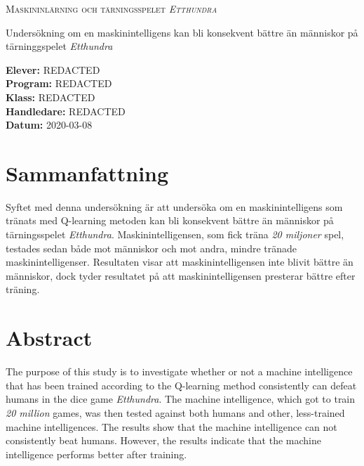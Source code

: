 \documentclass[12pt,a4paper]{article}
\begin{document}
  \begin{titlepage}
    \begin{center}
      \begin{huge}\textsc{Maskininlärning och tärningsspelet \emph{Etthundra}} \\
        \vspace{0.75cm}
      \end{huge}
      \large{Undersökning om en maskinintelligens kan bli konsekvent bättre än människor på tärninggspelet \emph{Etthundra}}
    \end{center}


    \vspace{\fill}
    \begin{flushleft}
      \textbf{Elever:} REDACTED \\
      \textbf{Program:} REDACTED \\
      \textbf{Klass:} REDACTED \\
      \textbf{Handledare:} REDACTED \\
      \textbf{Datum:} 2020-03-08
    \end{flushleft}
  \end{titlepage}
  

  \section*{Sammanfattning}\label{sec:samanfattning}
    Syftet med denna undersökning är att undersöka om en maskinintelligens som tränats med Q-learning metoden kan bli konsekvent bättre än människor på tärningsspelet \emph{Etthundra}. Maskinintelligensen, som fick träna \emph{20 miljoner} spel, testades sedan både mot människor och mot andra, mindre tränade maskinintelligenser. Resultaten visar att maskinintelligensen inte blivit bättre än människor, dock tyder resultatet på att maskinintelligensen presterar bättre efter träning.


  \section*{Abstract}\label{sec:abstract}
    The purpose of this study is to investigate whether or not a machine intelligence that has been trained according to the Q-learning method consistently can defeat humans in the dice game \emph{Etthundra}. The machine intelligence, which got to train \emph{20 million} games, was then tested against both humans and other, less-trained machine intelligences. The results show that the machine intelligence can not consistently beat humans. However, the results indicate that the machine intelligence performs better after training.
  \cleardoublepage
\end{document}
